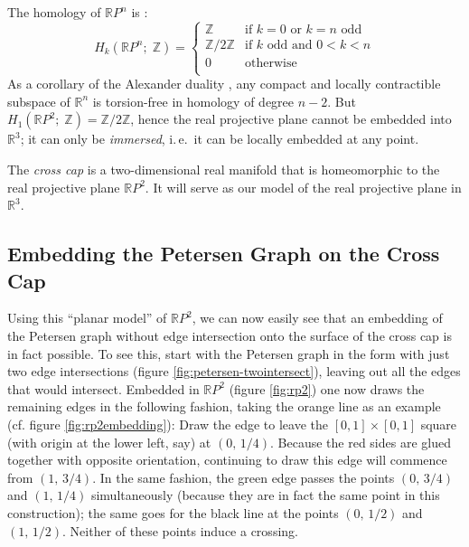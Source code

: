 \documentclass[11pt,            %
               a4paper,         %
               oneside,         %
               DIV12,           %
               fleqn,           %
               halfparskip,     %
               nochapterprefix, %
              ]{scrartcl} %
\theoremstyle{definition}
\begin{document}
The homology of $\mathbb{R}P^n$ is \cite[2.42]{hatcher}:
\[
  H_k(\mathbb{R}P^n;\;\mathbb{Z}) =
                   \begin{cases}
                      \mathbb{Z} & \text{if }k = 0\text{ or }k = n\text{ odd} \\
                      \mathbb{Z}/2\mathbb{Z} & \text{if $k$ odd and } 0 < k < n \\
                      0 & \text{otherwise} \\
                   \end{cases}
\]
As a corollary of the Alexander duality \cite[3.45]{hatcher}, any compact and locally
contractible subspace of $\mathbb{R}^n$ is torsion-free in homology of
degree $n-2$. But $H_1(\mathbb{R}P^2;\;\mathbb{Z}) = \mathbb{Z}/2\mathbb{Z}$, hence
the real projective plane cannot be embedded into $\mathbb{R}^3$; it
can only be \emph{immersed}, i.\,e.~it can be locally embedded at any
point.

The \emph{cross cap} is a two-dimensional real manifold that is
homeomorphic to the real projective plane $\mathbb{R}P^2$. It will
serve as our model of the real projective plane in $\mathbb{R}^3$.

\subsection{Embedding the Petersen Graph on the Cross Cap}
\label{sec:rp2embedding}

Using this “planar model” of $\mathbb{R}P^2$, we can now easily see
that an embedding of the Petersen graph without edge intersection onto
the surface of the cross cap is in fact possible.
To see this, start with the Petersen graph in the form with just two
edge intersections (figure \ref{fig:petersen-twointersect}), leaving
out all the edges that would intersect.
Embedded in $\mathbb{R}P^2$ (figure \ref{fig:rp2}) one now draws the
remaining edges in the following fashion, taking the orange line as an
example (cf. figure \ref{fig:rp2embedding}):
Draw the edge to leave the $[0,1]\times[0,1]$ square (with origin at
the lower left, say) at $(0,\,1/4)$.
Because the red sides are glued together with opposite orientation,
continuing to draw this edge will commence from $(1,\,3/4)$.
In the same fashion, the green edge passes the points $(0,\,3/4)$ and
$(1,\,1/4)$ simultaneously (because they are in fact the same point in
this construction); the same goes for the black line at the points
$(0,\,1/2)$ and $(1,\,1/2)$.
Neither of these points induce a crossing.
\end{document}
